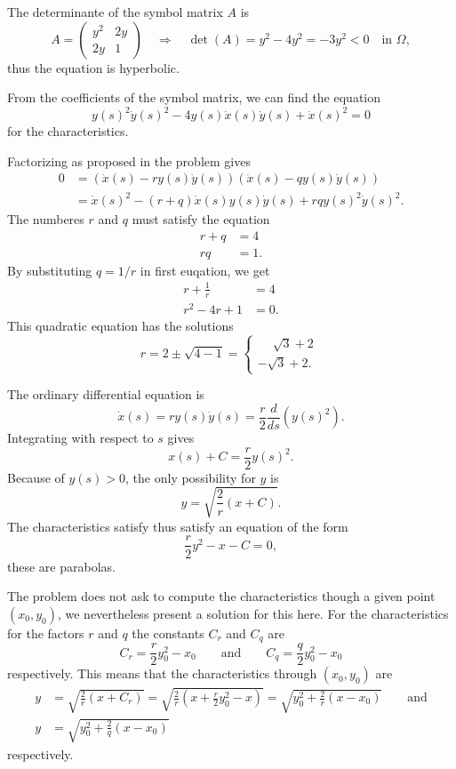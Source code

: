 \begin{loesung}
\begin{teilaufgaben}
\item
The determinante of the symbol matrix $A$ is
\[
A=\begin{pmatrix}
y^2&2y\\
2y&1
\end{pmatrix}
\quad\Rightarrow\quad
\det (A)=y^2-4y^2=-3y^2<0 \quad\text{in $\Omega$},
\]
thus the equation is hyperbolic.
\item
From the coefficients of the symbol matrix, we can find the equation
\[
y(s)^2\dot y(s)^2-4y(s)\dot x(s)\dot y(s)+\dot x(s)^2=0
\]
for the characteristics.
\item
Factorizing as proposed in the problem gives
\begin{align*}
0&=(\dot x(s)-ry(s)\dot y(s))(\dot x(s)-qy(s)\dot y(s))
\\
&=\dot x(s)^2-(r+q)\dot x(s) y(s)\dot y(s)+rqy(s)^2\dot y(s)^2.
\end{align*}
The numberes $r$ and $q$ must satisfy the equation
\begin{align*}
r+q&=4\\
rq&=1.
\end{align*}
By substituting
$q=1/r$ in first euqation, we get
\begin{align*}
r+\frac1r&=4\\
r^2-4r+1&=0.
\end{align*}
This quadratic equation has the solutions
\[
r
=
2\pm\sqrt{4-1}
=
\begin{cases}
\phantom{-}\sqrt{3}+2\phantom{.}\\
         - \sqrt{3}+2.
\end{cases}
\]
\item
The ordinary differential equation is
\[
\dot x(s)=ry(s)\dot y(s)=\frac{r}{2}\frac{d}{ds}(y(s)^2).
\]
Integrating with respect to $s$ gives
\[
x(s) + C=\frac{r}{2}y(s)^2.
\]
Because of $y(s)>0$, the only possibility for $y$ is
\[
y = \sqrt{\frac{2}{r}(x+C)}.
\]
The characteristics satisfy thus satisfy an equation of the form
\[
\frac{r}2y^2-x-C=0,
\]
these are parabolas.
\end{teilaufgaben}
The problem does not ask to compute the characteristics though a given
point $(x_0,y_0)$, we nevertheless present a solution for this here.
For the characteristics for the factors $r$ and $q$ the constants
$C_r$ and $C_q$ are
\[
C_r=\frac{r}{2}y_0^2-x_0
\qquad
\text{and}
\qquad
C_q=\frac{q}{2}y_0^2-x_0
\]
respectively.
This means that the characteristics through 
$(x_0,y_0)$ are
\begin{align*}
y&=\sqrt{
\frac2r(x+C_r)
}
=
\sqrt{
\frac2r(x+
\frac{r}{2}y_0^2-x
)
}
=\sqrt{y_0^2+\frac2r(x-x_0)}
\qquad\text{and}
\\
y&
=\sqrt{y_0^2+\frac2q(x-x_0)}
\end{align*}
respectively.
\end{loesung}
